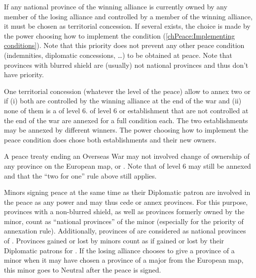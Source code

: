 \aparag[Priority] If any national province of the winning alliance is
currently owned by any member of the losing alliance and controlled by a
member of the winning alliance, it must be chosen as territorial concession.
\bparag If several exists, the choice is made by the power choosing how to
implement the condition (\ref{chPeace:Implementing conditions}).
\bparag Note that this priority does not prevent any other peace condition
(indemnities, diplomatic concessions, \ldots) to be obtained at peace.
\bparag Note that provinces with blurred shield are (usually) not national
provinces and thus don't have priority.

\bparag One territorial concession (whatever the level of the peace) allow to
annex two \COL or \TP if (i) both are controlled by the winning alliance at
the end of the war and (ii) none of them is a \COL of level 6.
\bparag \COL of level 6 or establishment that are not controlled at the end of
the war are annexed for a full condition each.
\bparag The two establishments may be annexed by different winners.
\bparag The power choosing how to implement the peace condition does chose
both establishments and their new owners.

A peace treaty ending an Overseas War may not involved change of ownership of
any province on the European map,  or .
\bparag Note that \COL of level 6 may still be annexed and that the ``two for
one'' rule above still applies.

\bparag Minors signing peace at the same time as their Diplomatic patron are
involved in the peace as any power and may thus cede or annex provinces.
\bparag For this purpose, provinces with a non-blurred shield, as well as
provinces formerly owned by the minor, count as ``national provinces'' of the
minor (especially for the priority of annexation rule).
\bparag Additionally, provinces of \regionBalkans are considered as national
provinces of \paysVenise.
\bparag Provinces gained or lost by minors count as if gained or lost by their
Diplomatic patrons for \VPs.
\bparag If the losing alliance chooses to give a province of a minor when it
may have chosen a province of a major from the European map, this minor goes
to Neutral after the peace is signed.


